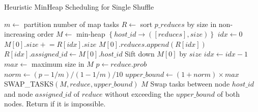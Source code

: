 \begin{minipage}{\columnwidth}
\begin{algorithm}[H]
\caption{Heuristic MinHeap Scheduling for Single Shuffle}
\label{hminheap}
	\begin{algorithmic}[1]
	\small
		\State $m\gets$ partition number of map tasks
		\State $R\gets$ sort $p\_reduces$ by size in non-increasing order
		\State $M\gets$ min-heap $\left\{ host\_id \rightarrow \left( \left[ reduces \right], size \right) \right\}$
		\State $idx\gets 0$
		\State $M\left[0\right].size \mathrel{+}= R\left[idx\right].size$
		\State $M\left[0\right].reduces.append\left(R\left[idx\right]\right)$
		\State $R\left[idx\right].assigned\_id \gets M \left[0\right].host\_id$
		\State Sift down $M\left[0\right]$ by $size$
		\State $idx\gets idx-1$
		\EndWhile
		\State $max\gets$ maximum size in $M$
				\State $p\gets reduce.prob$
				\State $norm\gets \left(p-1/m\right)/\left(1-1/m\right)/10$
				\State $upper\_bound \gets \left(1 + norm\right) \times max$
				\State SWAP\_TASKS$\left(M, reduce, upper\_bound\right)$
			\EndIf
		\EndFor
		\Return $M$
	\EndProcedure
		\State Swap tasks between node $host\_id$ and node $assigned\_id$
		\State of $reduce$ without exceeding the $upper\_bound$
		\State of both nodes.
		\State Return if it is impossible.
	\EndProcedure
	\end{algorithmic}
\end{algorithm}
\end{minipage}

